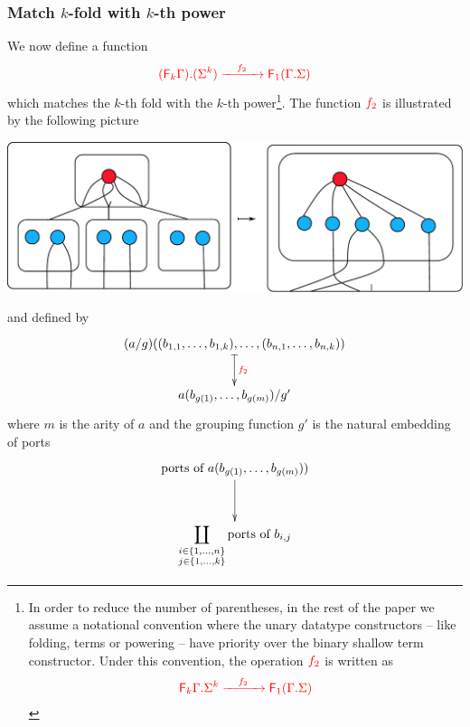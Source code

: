 \subsubsection{Match $k$-fold with $k$-th power}
We now define a function 
\begin{align*}
{\color{red}{{\color{red}{({\color{red}{\mathsf F_{k}}}\Gamma) . (\Sigma^k)}} \xrightarrow{\quad f_2\quad} {\color{red}{\mathsf F_{1}}}({\color{red}{\Gamma . \Sigma}})}} 
\end{align*}
which matches the $k$-th fold with the $k$-th power\footnote{In order to reduce the number of parentheses, in  the rest of the paper we assume a notational convention where the unary datatype constructors -- like folding, terms or powering -- have priority over the binary shallow term constructor. Under this convention, the operation ${\color{red}{f_2}}$ is written as 
\begin{align*}
    {\color{red}{{\color{red}{{\color{red}{\mathsf F_{k}}}\Gamma . \Sigma^k}} \xrightarrow{\quad f_2\quad} {\color{red}{\mathsf F_{1}}}({\color{red}{\Gamma . \Sigma}})}} 
    \end{align*}}.
    The function ${\color{red}{f_2}}$ is illustrated by the following  picture
\begin{center}
\includegraphics[scale=.35]{pictures/shallow-unfold}
\end{center}
and  defined by
\begin{eqnarray*}
    \xymatrix{
        (a/g)((b_{1,1},\dots,b_{1,k}),\dots, (b_{n,1},\dots,b_{n,k})) 
        \ar@{|->}[d]^{\ranked{f_2}} \\
         a(b_{g(1)},\dots,b_{g(m)})/g'
    }
\end{eqnarray*}
where $m$ is the arity of $a$ and the grouping function  $g'$ is  the natural embedding of ports 
\begin{align*}
\xymatrix{
    \text{ports of $a(b_{g(1)},\dots,b_{g(m)}))$}
    \ar[d]
    \\
 \displaystyle{\coprod_{\substack{i \in \set{1,\ldots,n}\\ j \in \set{1,\ldots,k}}} \text{ports of $b_{i,j}$}} 
}
\end{align*}
\smallskip


